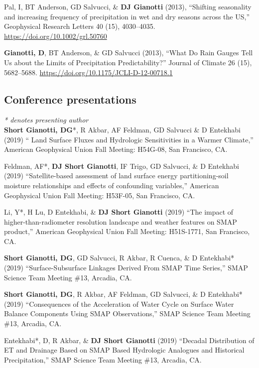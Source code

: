 \documentclass[10pt, a4paper]{article}
\renewcommand{\emph}[1]{\textit{#1}}
\newcommand{\lbr}{\vspace*{12pt}}
\newcommand{\years}[1]{\mbox{}\marginnote{\scriptsize #1}} %
\begin{document}
\years{2013b}Pal, I, BT Anderson, GD Salvucci, \& \textbf{DJ Gianotti} (2013), ``Shifting seasonality and increasing frequency of precipitation in wet and dry seasons across the US,'' Geophysical Research Letters 40 (15), 4030--4035. \url{https://doi.org/10.1002/grl.50760} \lbr

\years{2013a}\textbf{Gianotti, D}, BT Anderson, \& GD Salvucci (2013), ``What Do Rain Gauges Tell Us about the Limits of Precipitation Predictability?'' Journal of Climate 26 (15), 5682--5688. \url{https://doi.org/10.1175/JCLI-D-12-00718.1} \lbr

\subsection*{Conference presentations}
\emph{* denotes presenting author} \\

\noindent
\years{2019}\textbf{Short Gianotti, DG}*, R Akbar, AF Feldman, GD Salvucci \& D Entekhabi (2019) `` Land Surface Fluxes and Hydrologic Sensitivities in a Warmer Climate,'' American Geophysical Union Fall Meeting: H54G-08, San Francisco, CA.\lbr %

\years{2019}Feldman, AF*, \textbf{DJ Short Gianotti}, IF Trigo, GD Salvucci, \& D Entekhabi (2019) ``Satellite-based assessment of land surface energy partitioning-soil moisture relationships and effects of confounding variables,'' American Geophysical Union Fall Meeting: H53F-05, San Francisco, CA.\lbr %

\years{2019}Li, Y*, H Lu, D Entekhabi, \& \textbf{DJ Short Gianotti} (2019) ``The impact of higher-than-radiometer resolution landscape and weather features on SMAP product,'' American Geophysical Union Fall Meeting: H51S-1771, San Francisco, CA.\lbr %

\years{2019}\textbf{Short Gianotti, DG}, GD Salvucci, R Akbar, R Cuenca, \& D Entekhabi* (2019) ``Surface-Subsurface Linkages Derived From SMAP Time Series,'' SMAP Science Team Meeting \#13, Arcadia, CA.\lbr %

\years{2019}\textbf{Short Gianotti, DG}, R Akbar, AF Feldman, GD Salvucci, \& D Entekhabi* (2019) ``Consequences of the Acceleration of Water Cycle on Surface Water Balance Components Using SMAP Observations,'' SMAP Science Team Meeting \#13, Arcadia, CA.\lbr %

\years{2019}Entekhabi*, D, R Akbar, \& \textbf{DJ Short Gianotti} (2019) ``Decadal Distribution of ET and Drainage Based on SMAP Based Hydrologic Analogues and Historical Precipitation,'' SMAP Science Team Meeting \#13, Arcadia, CA.\lbr %
\end{document}
